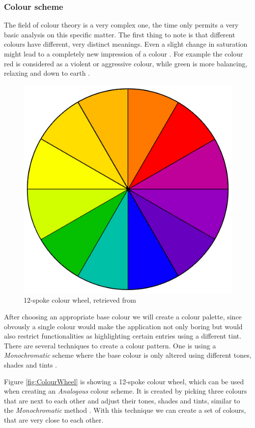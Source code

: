 \subsubsection{Colour scheme}
\label{sec:ColourConcept}

The field of colour theory is a very complex one, the time only permits a very basic analysis on this specific matter. The first thing to note is that different colours have different, very distinct meanings. Even a slight change in saturation might lead to a completely new impression of a colour \cite{Chapman:2010aa}. For example the colour red is considered as a violent or aggressive colour, while green is more balancing, relaxing and down to earth \cite{Chapman:2010aa}.

\begin{figure}[h]
  	\centering
  	\includegraphics[width=0.5\linewidth]{./images/colorwheel.jpg}
  	\caption{12-spoke colour wheel, retrieved from \cite{Chapman:2010ab}}
	\label{fig:ColourWheel}
\end{figure}

After choosing an appropriate base colour we will create a colour palette, since obvously a single colour would make the application not only boring but would also restrict functionalities as highlighting certain entries using a different tint. There are several techniques to create a colour pattern. One is using a \emph{Monochromatic} scheme where the base colour is only altered using different tones, shades and tints \cite{Chapman:2010ab}. 


Figure \vref{fig:ColourWheel} is showing a 12-spoke colour wheel, which can be used when creating an \emph{Analogous} colour scheme. It is created by picking three colours that are next to each other and adjust their tones, shades and tints, similar to the \emph{Monochromatic} method \cite{Chapman:2010ab}. With this technique we can create a set of colours, that are very close to each other.


